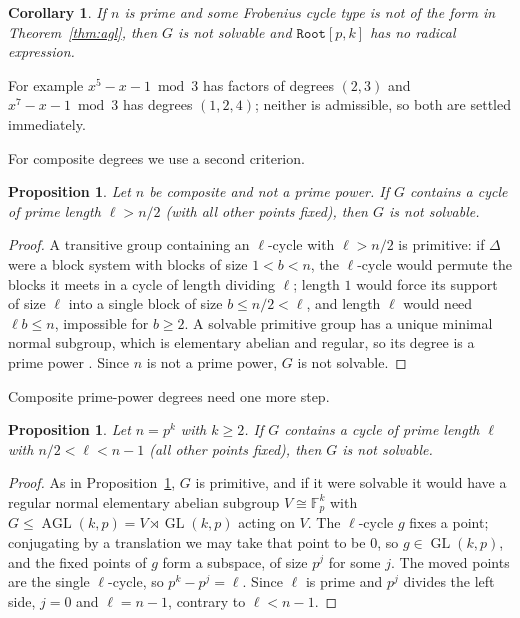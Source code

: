 \documentclass[11pt,a4paper]{article}
\newtheorem{proposition}[theorem]{Proposition}
\newtheorem{corollary}[theorem]{Corollary}
\theoremstyle{definition}
\theoremstyle{remark}
\newcommand{\F}{\mathbb{F}}
\newcommand{\AGL}{\operatorname{AGL}}
\newcommand{\code}[1]{\texttt{#1}}
\newcommand{\Root}{\code{Root}}
\begin{document}
\begin{corollary}\label{cor:frob}
If $n$ is prime and some Frobenius cycle type is not of the form in
Theorem~\ref{thm:agl}, then $G$ is not solvable and $\Root[p,k]$ has no radical
expression.
\end{corollary}

For example $x^5-x-1\bmod 3$ has factors of degrees $(2,3)$ and $x^7-x-1\bmod 3$ has
degrees $(1,2,4)$; neither is admissible, so both are settled immediately.

For composite degrees we use a second criterion.

\begin{proposition}\label{prop:longcycle}
Let $n$ be composite and not a prime power.  If $G$ contains a cycle of prime length
$\ell>n/2$ (with all other points fixed), then $G$ is not solvable.
\end{proposition}

\begin{proof}
A transitive group containing an $\ell$-cycle with $\ell>n/2$ is primitive: if $\Delta$
were a block system with blocks of size $1<b<n$, the $\ell$-cycle would permute the
blocks it meets in a cycle of length dividing $\ell$; length $1$ would force its support
of size $\ell$ into a single block of size $b\le n/2<\ell$, and length $\ell$ would need
$\ell b\le n$, impossible for $b\ge2$.  A solvable primitive group has a unique minimal
normal subgroup, which is elementary abelian and regular, so its degree is a prime power
\cite[Chapter II]{Wielandt}.  Since $n$ is not a prime power, $G$ is not solvable.
\end{proof}

Composite prime-power degrees need one more step.

\begin{proposition}\label{prop:primepower}
Let $n=p^k$ with $k\ge2$.  If $G$ contains a cycle of prime length $\ell$ with
$n/2<\ell<n-1$ (all other points fixed), then $G$ is not solvable.
\end{proposition}

\begin{proof}
As in Proposition~\ref{prop:longcycle}, $G$ is primitive, and if it were solvable it
would have a regular normal elementary abelian subgroup $V\cong\F_p^k$ with
$G\le\AGL(k,p)=V\rtimes\operatorname{GL}(k,p)$ acting on $V$.  The $\ell$-cycle $g$ fixes
a point; conjugating by a translation we may take that point to be $0$, so
$g\in\operatorname{GL}(k,p)$, and the fixed points of $g$ form a subspace, of size $p^j$
for some $j$.  The moved points are the single $\ell$-cycle, so $p^k-p^j=\ell$.  Since
$\ell$ is prime and $p^j$ divides the left side, $j=0$ and $\ell=n-1$, contrary to
$\ell<n-1$.
\end{proof}
\end{document}
